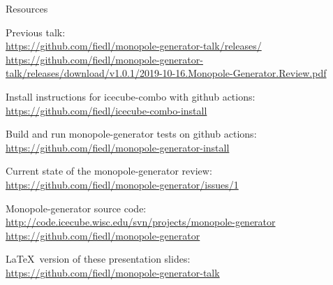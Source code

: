 
\begin{frame}{Resources}
  \begin{center}
    Previous talk: \\
    \url{https://github.com/fiedl/monopole-generator-talk/releases/} \\
    \url{https://github.com/fiedl/monopole-generator-talk/releases/download/v1.0.1/2019-10-16.Monopole-Generator.Review.pdf}

    \vspace{1em}

    Install instructions for icecube-combo with github actions: \\
    \url{https://github.com/fiedl/icecube-combo-install}

    \vspace{1em}

    Build and run monopole-generator tests on github actions: \\
    \url{https://github.com/fiedl/monopole-generator-install}

    \vspace{1em}

    Current state of the monopole-generator review: \\
    \url{https://github.com/fiedl/monopole-generator/issues/1}

    \vspace{1em}

    Monopole-generator source code: \\
    \url{http://code.icecube.wisc.edu/svn/projects/monopole-generator} \\
    \url{https://github.com/fiedl/monopole-generator}

    \vspace{1em}

    \LaTeX\ version of these presentation slides: \\
    \url{https://github.com/fiedl/monopole-generator-talk}
  \end{center}
\end{frame}